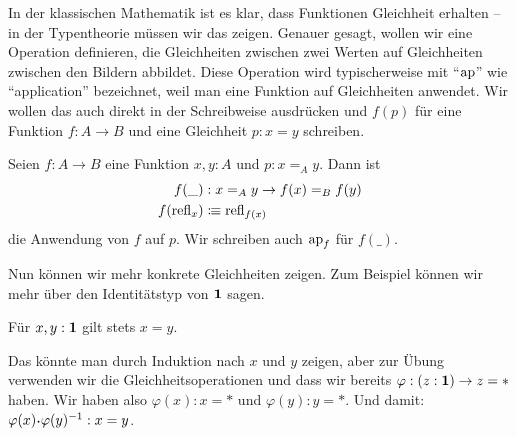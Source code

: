 In der klassischen Mathematik ist es klar, dass Funktionen Gleichheit erhalten -- in der Typentheorie müssen wir das zeigen.
Genauer gesagt, wollen wir eine Operation definieren, die Gleichheiten zwischen zwei Werten auf Gleichheiten zwischen den Bildern abbildet.
Diese Operation wird typischerweise mit ``$\mathrm{ap}$'' wie ``application'' bezeichnet, weil man eine Funktion auf Gleichheiten anwendet. 
Wir wollen das auch direkt in der Schreibweise ausdrücken und $f( p)$ für eine Funktion $f:A\to B$ und eine Gleichheit $ p:x=y$ schreiben.

\begin{definition}
  Seien $f:A\to B$ eine Funktion $x,y:A$ und $ p:x=_Ay$.
  Dann ist
  \begin{align*}
    f(\_) &: x=_Ay\to f(x)=_Bf(y) \\
    f(\mathrm{refl}_x)&\vcentcolon\mspace{-1.2mu}\equiv \mathrm{refl}_{f(x)}
  \end{align*}
  die Anwendung von $f$ auf $ p$. Wir schreiben auch $\mathrm{ap}_f$ für $f(\_)$.
\end{definition}

Nun können wir mehr konkrete Gleichheiten zeigen.
Zum Beispiel können wir mehr über den Identitätstyp von $\mathbf{1}$ sagen.

\begin{lemma}
  Für $x,y:\mathbf{1}$ gilt stets $x=y$.  
\end{lemma}
\begin{beweis}
 Das könnte man durch Induktion nach $x$ und $y$ zeigen,
 aber zur Übung verwenden wir die Gleichheitsoperationen und dass wir bereits $\varphi:(z:\mathbf{1})\to z=\ast$ haben.
 Wir haben also $\varphi(x):x=\ast$ und $\varphi(y):y=\ast$.
 Und damit: $\varphi(x)\kon\varphi(y)^{-1}:x=y$.
\end{beweis}

